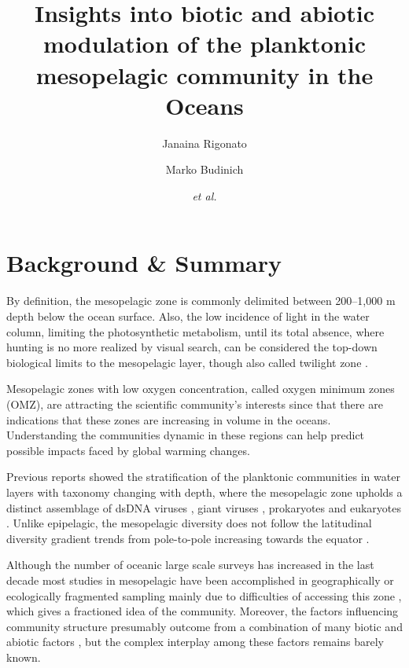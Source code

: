 \documentclass[fleqn,10pt]{wlscirep}
\title{Insights into biotic and abiotic modulation of the planktonic mesopelagic community in the Oceans}
\author[1,$\dag$]{Janaina Rigonato}
\author[2,$\dag$]{Marko Budinich}
\author[1,2]{\textit{et al.}}
\affil[$\dag$]{these authors contributed equally to this work}
\begin{document}
\flushbottom
\maketitle

\thispagestyle{empty}



\section*{Background \& Summary}

By definition, the mesopelagic zone is commonly delimited between 200–1,000 m depth below the ocean surface. Also, the low incidence of light in the water column, limiting the photosynthetic metabolism, until its total absence, where hunting is no more realized by visual search, can be considered the top-down biological limits to the mesopelagic layer, though also called twilight zone \cite{robinson_mesopelagic_2010}.

Mesopelagic zones with low oxygen concentration, called oxygen minimum zones (OMZ), are attracting the scientific community's interests since that there are indications that these zones are increasing in volume in the oceans. Understanding the communities dynamic in these regions can help predict possible impacts faced by global warming changes.

Previous reports showed the stratification of the planktonic communities in water layers with taxonomy changing with depth, where the mesopelagic zone upholds a distinct assemblage  of dsDNA viruses \cite{gregory_marine_2019}, giant viruses \cite{endo_biogeography_2020}, prokaryotes \cite{sunagawa_structure_2015,salazar_gene_2019} and eukaryotes \cite{giner_marked_2020}. Unlike epipelagic, the mesopelagic diversity does not follow the latitudinal diversity gradient trends from pole-to-pole increasing towards the equator \cite{ibarbalz_global_2019}.


Although the number of oceanic large scale surveys has increased in the last decade \cite{rusch_sorcerer_2007,karsenti_holistic_2011,pernice_global_2015} most studies in mesopelagic have been accomplished in geographically or ecologically fragmented sampling mainly due to difficulties of accessing this zone \cite{hidalgo_developing_2019}, which gives a fractioned idea of the community. Moreover, the factors influencing community structure presumably outcome from a combination of many biotic and abiotic factors \cite{lima-mendez_determinants_2015, louca_integrating_2016}, but the complex interplay among these factors remains barely known.
\end{document}
